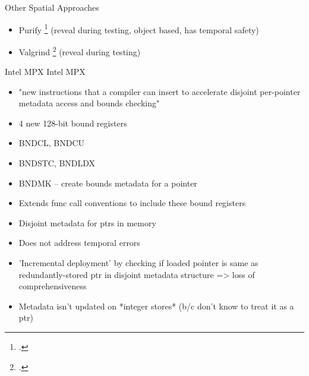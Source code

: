 \documentclass[aspectratio=169]{beamer}
\begin{document}

\begin{frame}{Other Spatial Approaches}
\begin{itemize}
    \item Purify \footcite{hastings_purify:_1991} (reveal during testing, object based, has temporal safety)
    \item Valgrind \footcite{nethercote_how_2007} (reveal during testing)
\end{itemize}
\end{frame}

\begin{frame}{Intel MPX}
\footnotesize
  Intel MPX %
    \begin{itemize}
     \item "new instructions that a compiler can insert to accelerate disjoint per-pointer metadata access and bounds checking"
     \item 4 new 128-bit bound registers
     \item BNDCL, BNDCU
     \item BNDSTC, BNDLDX
     \item BNDMK -- create bounds metadata for a pointer
     \item Extends func call conventions to include these bound registers
     \item Disjoint metadata for ptrs in memory
     \item Does not address temporal errors
     \item 'Incremental deployment' by checking if loaded pointer is same as redundantly-stored ptr in disjoint metadata structure => loss of comprehensiveness
     \item Metadata isn't updated on *integer stores* (b/c don't know to treat it as a ptr)
    \end{itemize}
\end{frame}
\end{document}
